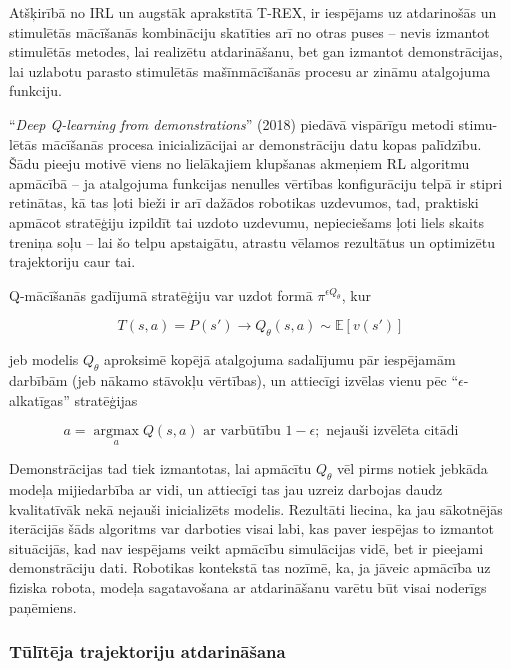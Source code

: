 \documentclass[12pt, a4paper]{article}
\numberwithin{equation}{section} %
\begin{document}
Atšķirībā no IRL un augstāk aprakstītā T-REX, ir iespējams uz atdarinošās un stimulētās mācīšanās kombināciju skatīties arī no otras puses -- nevis izmantot stimulētās metodes, lai realizētu atdarināšanu, bet gan izmantot demonstrācijas, lai uzlabotu parasto stimulētās mašīnmācīšanās procesu ar zināmu atalgojuma funkciju.

``\textit{Deep Q-learning from demonstrations}'' \cite{hester2018deep} (2018) piedāvā vispārīgu metodi stimu-lētās mācīšanās procesa inicializācijai ar demonstrāciju datu kopas palīdzību. Šādu pieeju motivē viens no lielākajiem klupšanas akmeņiem RL algoritmu apmācībā -- ja atalgojuma funkcijas nenulles vērtības konfigurāciju telpā ir stipri retinātas, kā tas ļoti bieži ir arī dažādos robotikas uzdevumos, tad, praktiski apmācot stratēģiju izpildīt tai uzdoto uzdevumu, nepieciešams ļoti liels skaits treniņa soļu -- lai šo telpu apstaigātu, atrastu vēlamos rezultātus un optimizētu trajektoriju caur tai.

Q-mācīšanās gadījumā stratēģiju var uzdot formā $\pi^{\epsilon Q_{\theta}}$, kur

\begin{equation}
    T(s,a) = P(s') \rightarrow Q_{\theta}(s,a) \sim \mathbb{E}[v(s')] 
\end{equation}

jeb modelis $Q_{\theta}$ aproksimē kopējā atalgojuma sadalījumu pār iespējamām darbībām (jeb nākamo stāvokļu vērtības), un attiecīgi izvēlas vienu pēc ``$\epsilon$-alkatīgas'' stratēģijas

\begin{equation}
    a = \operatorname*{argmax}_a Q(s,a) \text{ ar varbūtību } 1-\epsilon; \text{ nejauši izvēlēta citādi}
\end{equation}

Demonstrācijas tad tiek izmantotas, lai apmācītu $Q_{\theta}$ vēl pirms notiek jebkāda modeļa mijiedarbība ar vidi, un attiecīgi tas jau uzreiz darbojas daudz kvalitatīvāk nekā nejauši inicializēts modelis. Rezultāti liecina, ka jau sākotnējās iterācijās šāds algoritms var darboties visai labi, kas paver iespējas to izmantot situācijās, kad nav iespējams veikt apmācību simulācijas vidē, bet ir pieejami demonstrāciju dati. Robotikas kontekstā tas nozīmē, ka, ja jāveic apmācība uz fiziska robota, modeļa sagatavošana ar atdarināšanu varētu būt visai noderīgs paņēmiens.


\subsubsection{Tūlītēja trajektoriju atdarināšana}
\end{document}
